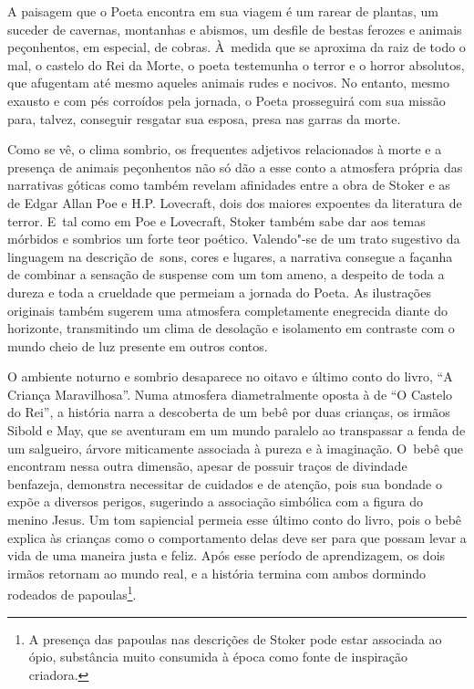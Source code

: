 A paisagem que o Poeta encontra em sua viagem é um rarear de plantas, um
suceder de cavernas, montanhas e abismos, um desfile de bestas ferozes e
animais peçonhentos, em especial, de cobras. À~medida que se aproxima da
raiz de todo o mal, o castelo do Rei da Morte, o poeta testemunha o
terror e o horror absolutos, que afugentam até mesmo aqueles animais
rudes e nocivos. No entanto, mesmo exausto e com pés corroídos pela
jornada, o Poeta prosseguirá com sua missão para, talvez, conseguir
resgatar sua esposa, presa nas garras da morte.

Como se vê, o clima sombrio, os frequentes adjetivos relacionados à
morte e a presença de animais peçonhentos não só dão a esse conto a
atmosfera própria das narrativas góticas como também revelam afinidades
entre a obra de Stoker e as de Edgar Allan Poe e H.P. Lovecraft, dois
dos maiores expoentes da literatura de terror. E~tal como em Poe e
Lovecraft, Stoker também sabe dar aos temas mórbidos e sombrios um forte
teor poético. Valendo"-se de um trato sugestivo da linguagem na descrição
de~sons, cores e lugares, a narrativa consegue a façanha de combinar a
sensação de suspense com um tom ameno, a despeito de toda a dureza e
toda a crueldade que permeiam a jornada do Poeta. As ilustrações
originais também sugerem uma atmosfera completamente enegrecida diante
do horizonte, transmitindo um clima de desolação e isolamento em
contraste com o mundo cheio de luz presente em outros contos.

O ambiente noturno e sombrio desaparece no oitavo e último conto do
livro, ``A Criança Maravilhosa''. Numa atmosfera diametralmente oposta à
de ``O Castelo do Rei'', a história narra a descoberta de um bebê por
duas crianças, os irmãos Sibold e May, que se aventuram em um mundo
paralelo ao transpassar a fenda de um salgueiro, árvore miticamente
associada à pureza e à imaginação. O~bebê que encontram nessa outra
dimensão, apesar de possuir traços de divindade benfazeja, demonstra
necessitar de cuidados e de atenção, pois sua bondade o expõe a diversos
perigos, sugerindo a associação simbólica com a figura do menino Jesus.
Um tom sapiencial permeia esse último conto do livro, pois o bebê
explica às crianças como o comportamento delas deve ser para que possam
levar a vida de uma maneira justa e feliz. Após esse período de
aprendizagem, os dois irmãos retornam ao mundo real, e a história
termina com ambos dormindo rodeados de
papoulas\footnote{A presença das papoulas nas descrições de
Stoker pode estar associada ao ópio, substância muito consumida à época
como fonte de inspiração criadora.}.

